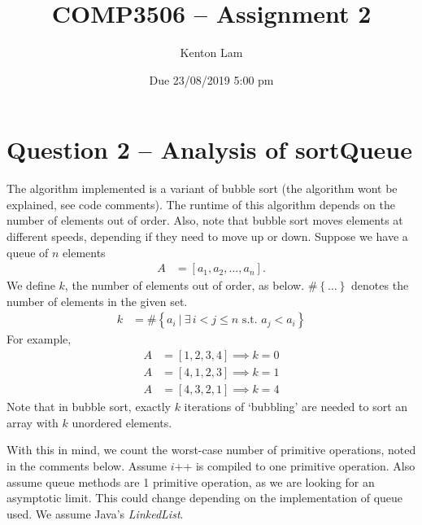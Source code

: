 \documentclass[11pt,a4paper]{article} %
\author{Kenton Lam}
\date{{Due 23/08/2019 5:00 pm}}
\title{COMP3506 -- Assignment 2}
\begin{document}
%

\setcounter{page}{1}
\maketitle
\section*{Question 2 -- {Analysis of {sortQueue}}}

The algorithm implemented is a variant of bubble sort (the algorithm wont be
explained, see code comments). The runtime of this algorithm depends on the number
of elements out of order. Also, note that bubble sort moves elements at different speeds,
depending if they need to move up or down. Suppose we have a queue of $n$ elements
\begin{align*}
    A &= \left[ a_1, a_2, \ldots, a_n \right].
\end{align*}
We define $k$, the number of elements 
out of order, as below. $\# \left\{ \ldots\right\}$ denotes the number of elements in the given set.
\begin{align*}
    k &= \# \left\{a_i ~|~ \exists\, i < j \le n \text{ s.t. } a_j < a_i\right\}
\end{align*}
For example, 
\begin{align*}
    A &= \left[ 1, 2, 3, 4 \right] \implies k = 0 \\ 
    A &= \left[ 4, 1, 2, 3 \right] \implies k = 1 \\ 
    A &= \left[ 4, 3, 2, 1 \right] \implies k = 4
\end{align*}
Note that in bubble sort, exactly $k$ iterations of `bubbling' are needed to sort
an array with $k$ unordered elements.

With this in mind, we count the worst-case number of primitive operations,
noted in the comments below. Assume $i$++ is compiled to one primitive operation.
Also assume queue methods are 1 primitive operation, as we are looking for an asymptotic 
limit. This could change depending 
on the implementation of queue used. We assume Java's \textit{LinkedList}.
\end{document}
